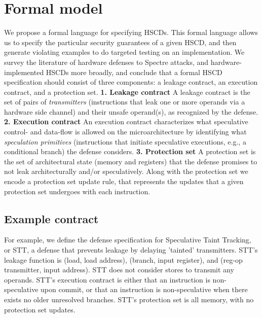 \section{Formal model}
We propose a formal language for specifying HSCDs. This formal language allows us to specify the particular security guarantees of a given HSCD, and then generate violating examples to do targeted testing on an implementation.
We survey the literature of hardware defenses to Spectre attacks, and hardware-implemented HSCDs more broadly, and conclude that a formal HSCD specification should consist of three components: a leakage contract, an execution contract, and a protection set.
\textbf{1. Leakage contract}
A leakage contract is the set of pairs of \textit{transmitters} (instructions that leak one or more operands via a hardware side channel) and their unsafe operand(s), as recognized by the defense.
\textbf{2. Execution contract}
An execution contract characterizes what speculative control- and data-flow is allowed on the microarchitecture by identifying what \textit{speculation primitives} (instructions that initiate speculative executions, e.g., a conditional branch) the defense considers. 
\textbf{3. Protection set}
A protection set is the set of architectural state (memory and registers) that the defense promises to not leak architecturally and/or speculatively. Along with the protection set we encode a protection set update rule, that represents the updates that a given protection set undergoes with each instruction.

\subsection{Example contract}
For example, we define the defense specification for Speculative Taint Tracking, or STT, a defense that prevents leakage by delaying 'tainted' transmitters. STT's leakage function is (load, load address), (branch, input register), and (reg-op transmitter, input address). STT does not consider stores to transmit any operands. STT's execution contract is either that an instruction is non-speculative upon commit, or that an instruction is non-speculative when there exists no older unresolved branches. STT's protection set is all memory, with no protection set updates. 

